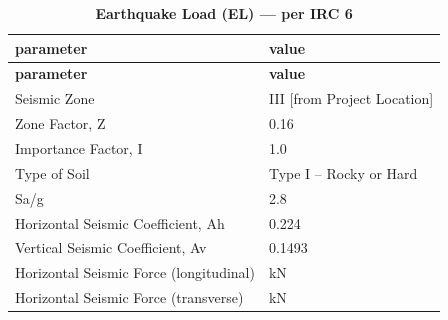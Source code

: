 \documentclass[12pt,a4paper]{report}
\numberwithin{table}{chapter}
\numberwithin{figure}{chapter}
\begin{document}
\newpage

\vspace{1em}
\begin{longtable}{|L{5.5cm}|p{10.0cm}|}
\caption{\textbf{Earthquake Load (EL) --- per IRC 6}}
\hline
\textbf{parameter} & \textbf{value} \\
\hline
\endfirsthead
\hline
\textbf{parameter} & \textbf{value} \\
\hline
\endhead
\textnormal{Seismic Zone} & III [from Project Location] \\[6pt]
\hline
\textnormal{Zone Factor, Z} & 0.16 \\[6pt]
\hline
\textnormal{Importance Factor, I} & 1.0 \\[6pt]
\hline
\textnormal{Type of Soil} & Type I – Rocky or Hard \\[6pt]
\hline
\textnormal{Sa/g} & 2.8 \\[6pt]
\hline
\textnormal{Horizontal Seismic Coefficient, Ah} & 0.224 \\[6pt]
\hline
\textnormal{Vertical Seismic Coefficient, Av} & 0.1493 \\[6pt]
\hline
\textnormal{Horizontal Seismic Force (longitudinal)} &  kN \\[6pt]
\hline
\textnormal{Horizontal Seismic Force (transverse)} &  kN \\[6pt]
\hline
\end{longtable}
\end{document}
